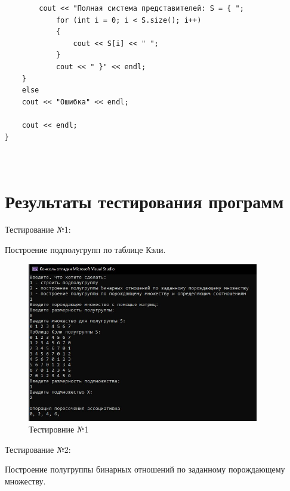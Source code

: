 \documentclass[bachelor, och, labwork]{shiza}
\begin{document}
\begin{verbatim}
		cout << "Полная система представителей: S = { ";
			for (int i = 0; i < S.size(); i++)
			{
				cout << S[i] << " ";
			}
			cout << " }" << endl;
	}
	else
	cout << "Ошибка" << endl;
	
	cout << endl;
}

		
	\end{verbatim}
	
	\section{Результаты тестирования программ}
	
	Тестирование №1:
	
Построение подполугрупп по таблице Кэли.

	\begin{figure}[H]
		\centering
		\includegraphics[width=0.9\textwidth]{test_1}
		\caption{Тестировние №1}
		\label{fig:test_1}
	\end{figure}
	
	Тестирование №2:
	
Построение полугруппы бинарных отношений по заданному порождающему множеству.
	
\end{document}
